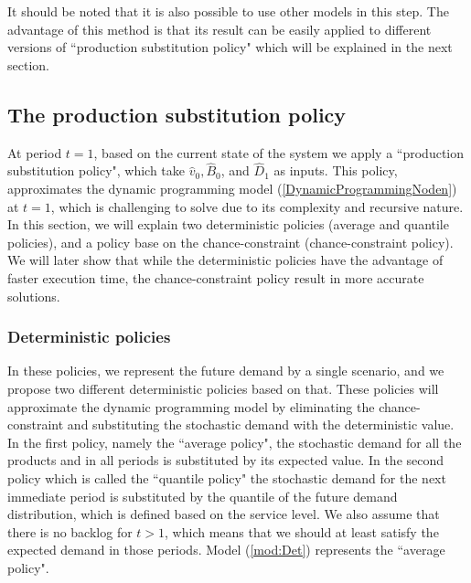 \documentclass[10pt]{article}
\newcommand{\ti}{t} %
\newcommand{\tAct}{\hat{\ti}} %
\newcommand{\cred}{\color{red!65!black}}
\begin{document}
It should be noted that it is also possible to use other models in this step. The advantage of this method is that its result can be easily applied to different versions of ``production substitution policy" which will be explained in the next section.

\subsection{The production substitution policy}
At period $\ti =1$, based on the current state of the system we apply a ``production substitution policy", which take $\hat{v}_{0}, \hat{B}_{0 }$, and $\hat{D}_1$ as inputs. This policy, approximates the dynamic programming model (\ref{DynamicProgrammingNoden}) at $\ti =1$, which is challenging to solve {\cred due to its complexity and recursive nature.}
In this section, we will explain two deterministic policies (average and quantile policies), and a policy base on the chance-constraint (chance-constraint policy). We will later show that while the deterministic policies have the advantage of faster execution time, the chance-constraint policy result in more accurate solutions.
 
\subsubsection{Deterministic policies}

In these policies, we represent the future demand by a single scenario, and we propose two different deterministic policies based on that. 
These policies will approximate the dynamic programming model
by eliminating the chance-constraint and substituting the stochastic demand  with the deterministic value.
In the first policy, namely the ``average policy", the stochastic demand for all the products and in all periods is substituted by its expected value. In the second policy which is called the ``quantile policy" the stochastic demand for the next immediate period is substituted by the quantile of the future demand distribution, which is defined based on the service level. We also assume that there is no backlog for $\ti > 1$, which means that we should at least satisfy the expected demand in those periods.
Model (\ref{mod:Det}) represents the ``average policy".
\end{document}
